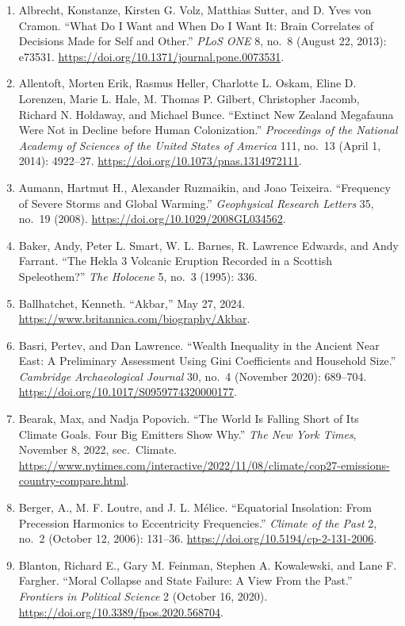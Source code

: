 \documentclass[12pt]{article}
\begin{document}
\begin{enumerate}[leftmargin=*]
\item Albrecht, Konstanze, Kirsten G. Volz, Matthias Sutter, and D. Yves von Cramon. ``What Do I Want and When Do I Want It: Brain Correlates of Decisions Made for Self and Other.'' \textit{PLoS ONE} 8, no.\ 8 (August 22, 2013): e73531. \url{https://doi.org/10.1371/journal.pone.0073531}.
\item Allentoft, Morten Erik, Rasmus Heller, Charlotte L. Oskam, Eline D. Lorenzen, Marie L. Hale, M. Thomas P. Gilbert, Christopher Jacomb, Richard N. Holdaway, and Michael Bunce. ``Extinct New Zealand Megafauna Were Not in Decline before Human Colonization.'' \textit{Proceedings of the National Academy of Sciences of the United States of America} 111, no.\ 13 (April 1, 2014): 4922--27. \url{https://doi.org/10.1073/pnas.1314972111}.
\item Aumann, Hartmut H., Alexander Ruzmaikin, and Joao Teixeira. ``Frequency of Severe Storms and Global Warming.'' \textit{Geophysical Research Letters} 35, no.\ 19 (2008). \url{https://doi.org/10.1029/2008GL034562}.
\item Baker, Andy, Peter L. Smart, W. L. Barnes, R. Lawrence Edwards, and Andy Farrant. ``The Hekla 3 Volcanic Eruption Recorded in a Scottish Speleothem?'' \textit{The Holocene} 5, no.\ 3 (1995): 336.
\item Ballhatchet, Kenneth. ``Akbar,'' May 27, 2024. \url{https://www.britannica.com/biography/Akbar}.
\item Basri, Pertev, and Dan Lawrence. ``Wealth Inequality in the Ancient Near East: A Preliminary Assessment Using Gini Coefficients and Household Size.'' \textit{Cambridge Archaeological Journal} 30, no.\ 4 (November 2020): 689--704. \url{https://doi.org/10.1017/S0959774320000177}.
\item Bearak, Max, and Nadja Popovich. ``The World Is Falling Short of Its Climate Goals. Four Big Emitters Show Why.'' \textit{The New York Times}, November 8, 2022, sec.\ Climate. \url{https://www.nytimes.com/interactive/2022/11/08/climate/cop27-emissions-country-compare.html}.
\item Berger, A., M. F. Loutre, and J. L. Mélice. ``Equatorial Insolation: From Precession Harmonics to Eccentricity Frequencies.'' \textit{Climate of the Past} 2, no.\ 2 (October 12, 2006): 131--36. \url{https://doi.org/10.5194/cp-2-131-2006}.
\item Blanton, Richard E., Gary M. Feinman, Stephen A. Kowalewski, and Lane F. Fargher. ``Moral Collapse and State Failure: A View From the Past.'' \textit{Frontiers in Political Science} 2 (October 16, 2020). \url{https://doi.org/10.3389/fpos.2020.568704}.

\end{enumerate}
\end{document}
